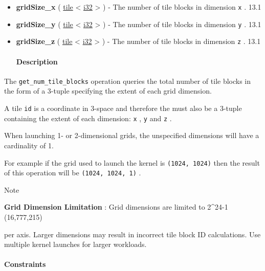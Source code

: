 \documentclass{article}
\begin{document}
\begin{itemize}
\item \textbf{gridSize\_x} ( \href{https://docs.nvidia.com/cuda/tile-ir/latest/sections/types.html#type-tile}{tile} < \href{https://docs.nvidia.com/cuda/tile-ir/latest/sections/types.html#subsection-element-types}{i32} > ) - The number of tile blocks in dimension \texttt{x} . 13.1
\item \textbf{gridSize\_y} ( \href{https://docs.nvidia.com/cuda/tile-ir/latest/sections/types.html#type-tile}{tile} < \href{https://docs.nvidia.com/cuda/tile-ir/latest/sections/types.html#subsection-element-types}{i32} > ) - The number of tile blocks in dimension \texttt{y} . 13.1
\item \textbf{gridSize\_z} ( \href{https://docs.nvidia.com/cuda/tile-ir/latest/sections/types.html#type-tile}{tile} < \href{https://docs.nvidia.com/cuda/tile-ir/latest/sections/types.html#subsection-element-types}{i32} > ) - The number of tile blocks in dimension \texttt{z} . 13.1


\paragraph{Description}

\end{itemize}
The \texttt{get\_num\_tile\_blocks} operation queries the total number of tile blocks in the form of a 3-tuple specifying the extent of each grid dimension.


A tile \texttt{id} is a coordinate in 3-space and therefore the must also be a 3-tuple containing the extent of each dimension: \texttt{x} , \texttt{y} and \texttt{z} .


When launching 1- or 2-dimensional grids, the unspecified dimensions will have a cardinality of 1.


For example if the grid used to launch the kernel is \texttt{(1024, 1024)} then the result of this operation will be \texttt{(1024, 1024, 1)} .


Note


\textbf{Grid Dimension Limitation} : Grid dimensions are limited to 2\textasciicircum{}24-1 (16,777,215)

per axis. Larger dimensions may result in incorrect tile block ID calculations. Use multiple kernel launches for larger workloads.



\paragraph{Constraints}
\end{document}

